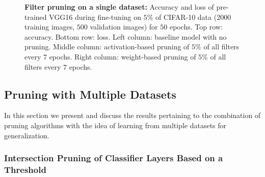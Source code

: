 \documentclass{article}
\begin{document}
\begin{figure}[!t]
{	}
	\caption{\textbf{Filter pruning on a single dataset:} Accuracy and loss of pre-trained VGG16 during fine-tuning on $5$\% of CIFAR-10 data ($2000$ training images, $500$ validation images) for $50$ epochs. Top row: accuracy. Bottom row: loss. Left column: baseline model with no pruning. Middle column: activation-based pruning of $5$\% of all filters every $7$ epochs. Right column: weight-based pruning of $5$\% of all filters every $7$ epochs.}
	\label{pruneFiltersSingle}
\end{figure}


\subsection{Pruning with Multiple Datasets}
In this section we present and discuss the results pertaining to the combination of pruning algorithms with the idea of learning from multiple datasets for generalization.

\subsubsection{Intersection Pruning of Classifier Layers Based on a Threshold}
\end{document}
